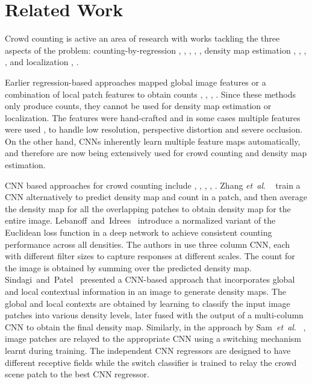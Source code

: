 \documentclass[runningheads]{llncs}
\newcommand{\etal}{\textit{et~al}. }
\begin{document}
\section{Related Work}\label{secRelatedWork}
Crowd counting is active an area of research with works tackling the three aspects of the problem: counting-by-regression \cite{ryan2009crowd}, \cite{zisserman-nips10}, \cite{idrees2013multi}, \cite{vasconcelos-cvpr08}, \cite{wang2015deep}, density map estimation \cite{zisserman-nips10}, \cite{fiaschi2012learning}, \cite{zhang2015cross}, \cite{pham2015count}, \cite{zhang2016single} and localization \cite{ma2015small}, \cite{rodriguez-iccv11b}.

Earlier regression-based approaches mapped global image features or a combination of local patch features to obtain counts \cite{kong2006viewpoint}, \cite{ccloy-shaogang-bmvc2012}, \cite{idrees2013multi}, \cite{chen2013cumulative}. Since these methods only produce counts, they cannot be used for density map estimation or localization. The features were hand-crafted and in some cases multiple features were used \cite{vasconcelos-cvpr08}, \cite{idrees2013multi} to handle low resolution, perspective distortion and severe occlusion. On the other hand, CNNs inherently learn multiple feature maps automatically, and therefore are now being extensively used for crowd counting and density map estimation.

CNN based approaches for crowd counting include \cite{lebanoff2015counting}, \cite{zhang2015cross}, \cite{zhang2016single}, \cite{onoro2016towards}, \cite{arteta2016counting}. Zhang \etal~\cite{zhang2015cross} train a CNN alternatively to predict density map and count in a patch, and then average the density map for all the overlapping patches to obtain density map for the entire image. Lebanoff~and~Idrees~\cite{lebanoff2015counting} introduce a normalized variant of the Euclidean loss function in a deep network to achieve consistent counting performance across all densities. The authors in \cite{zhang2016single} use three column CNN, each with different filter sizes to capture responses at different scales. The count for the image is obtained by summing over the predicted density map. Sindagi~and~Patel~\cite{sindagi2017generating} presented a CNN-based approach that incorporates global and local contextual information in an image to generate density maps. The global and local contexts are obtained by learning to classify the input image patches into various density levels, later fused with the output of a multi-column CNN to obtain the final density map. Similarly, in the approach by Sam~\etal~\cite{sam2017switching}, image patches are relayed to the appropriate CNN using a switching mechanism learnt during training. The independent CNN regressors are designed to have different receptive fields while the switch classifier is trained to relay the crowd scene patch to the best CNN regressor.
\end{document}

